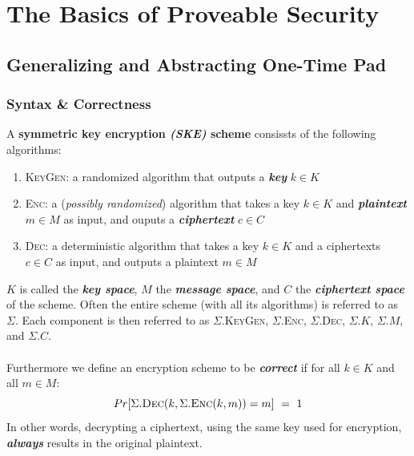 \documentclass{article}
\begin{document}
	\section{The Basics of Proveable Security}
		\begin{adjustwidth}{2em}{}
			\subsection{Generalizing and Abstracting One-Time Pad}
			\begin{adjustwidth}{2em}{}
				\subsubsection{Syntax \& Correctness}
				\begin{adjustwidth}{2em}{4em}
					A \textbf{symmetric key encryption \textit{(SKE)} scheme} consissts of the following algorithms:
					\begin{enumerate}[$\triangleright$]
						\item \textsc{KeyGen}: a randomized algorithm that outputs a \textbf{\textit{key}} $k \in K$
						\item \textsc{Enc}: a (\textit{possibly randomized}) algorithm that takes a key $k \in K$ and \textbf{\textit{plaintext}} $m \in M$ as input, and ouputs a \textbf{\textit{ciphertext}} $c \in C$
						\item \textsc{Dec}: a deterministic algorithm that takes a key $k \in K$ and a ciphertexts $c \in C$ as input, and outputs a plaintext $m \in M$
					\end{enumerate}
					$K$ is called the \textbf{\textit{key space}}, $M$ the \textbf{\textit{message space}}, and $C$ the \textbf{\textit{ciphertext space}} of the scheme. Often the entire scheme (with all its algorithms) is referred to as $\Sigma$. Each component is then referred to as $\Sigma$.\textsc{KeyGen}, $\Sigma$.\textsc{Enc}, $\Sigma$.\textsc{Dec}, $\Sigma.K$, $\Sigma.M$, and $\Sigma.C$. \\ \\
					Furthermore we define an encryption scheme to be \textbf{\textit{correct}} if for all $k \in K$ and all $m \in M$:
					\[
						Pr[\Sigma.\textsc{Dec}(k, \Sigma.\textsc{Enc}(k, m))=m] \ = \ 1 
					\]
					In other words, decrypting a ciphertext, using the same key used for encryption, \textbf{\textit{always}} results in the original plaintext.
				\end{adjustwidth}
			\end{adjustwidth}
			\newpage

\end{adjustwidth}
\end{document}
